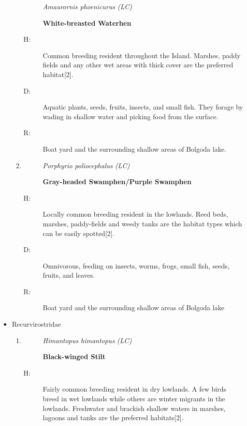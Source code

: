 \begin{itemize}
\begin{enumerate}
\begin{description}
\item[]%
\textit{Amaurornis phoenicurus (LC)}%
\item[]%
\textbf{White{-}breasted Waterhen}%
\end{description}%
\begin{description}%
\item[H: ]%
Common breeding resident throughout the Island. Marshes, paddy fields and any other wet areas with thick cover are the preferred habitat{[}2{]}.%
\item[D: ]%
Aquatic plants, seeds, fruits, insects, and small fish. They forage by wading in shallow water and picking food from the surface.%
\item[R: ]%
Boat yard and the surrounding shallow areas of Bolgoda lake.%
\end{description}%
\item%
\begin{description}%
\item[]%
\textit{Porphyrio poliocephalus (LC)}%
\item[]%
\textbf{Gray{-}headed Swamphen/Purple Swamphen}%
\end{description}%
\begin{description}%
\item[H: ]%
Locally common breeding resident in the lowlands. Reed beds, marshes, paddy-fields and weedy tanks are the habitat types which can be easily spotted{[}2{]}.%
\item[D: ]%
Omnivorous, feeding on insects, worms, frogs, small fish, seeds, fruits, and leaves.%
\item[R: ]%
Boat yard and the surrounding shallow areas of Bolgoda lake%
\end{description}%
\end{enumerate}%
\item%
Recurvirostridae%
\begin{enumerate}%
\item%
\begin{description}%
\item[]%
\textit{Himantopus himantopus (LC)}%
\item[]%
\textbf{Black{-}winged Stilt}%
\end{description}%
\begin{description}%
\item[H: ]%
Fairly common breeding resident in dry lowlands. A few birds breed in wet lowlands while others are winter migrants in the lowlands. Freshwater and brackish shallow waters in marshes, lagoons and tanks are the preferred habitats{[}2{]}.%

\end{description}
\end{enumerate}
\end{itemize}
